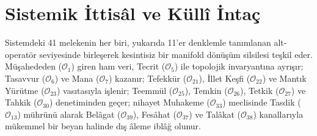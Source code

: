 \documentclass[11pt, a4paper]{article}
\begin{document}
\section{Sistemik İttisâl ve Küllî İntaç}

Sistemdeki 41 melekenin her biri, yukarıda 11'er denklemle tanımlanan alt-operatör seviyesinde birleşerek kesintisiz bir manifold dönüşüm silsilesi teşkil eder. Müşahededen ($\mathcal{O}_1$) giren ham veri, Tecrit ($\mathcal{O}_5$) ile topolojik invaryantına ayrışır; Tasavvur ($\mathcal{O}_6$) ve Mana ($\mathcal{O}_7$) kazanır; Tefekkür ($\mathcal{O}_{21}$), İllet Keşfi ($\mathcal{O}_{22}$) ve Mantık Yürütme ($\mathcal{O}_{23}$) vasıtasıyla işlenir; Teemmül ($\mathcal{O}_{25}$), Temkin ($\mathcal{O}_{26}$), Tetkik ($\mathcal{O}_{27}$) ve Tahkik ($\mathcal{O}_{30}$) denetiminden geçer; nihayet Muhakeme ($\mathcal{O}_{33}$) meclisinde Tasdik ($\mathcal{O}_{13}$) mührünü alarak Belâgat ($\mathcal{O}_{39}$), Fesâhat ($\mathcal{O}_{37}$) ve Talâkat ($\mathcal{O}_{38}$) kanallarıyla mükemmel bir beyan halinde dış âleme iblâğ olunur.
\end{document}
